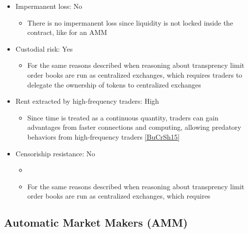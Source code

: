 \documentclass[11pt, reqno]{amsart}
\theoremstyle{definition}
\theoremstyle{remark}
\begin{document}
\begin{itemize}
\begin{itemize}
	      \end{itemize}
	\item Impermanent loss: No
	      \begin{itemize}
		      \item There is no impermanent loss since liquidity is not locked inside
                the contract, like for an AMM
	      \end{itemize}
	\item Custodial risk: Yes
	      \begin{itemize}
		      \item For the same reasons described when reasoning about transprency
                limit order books are run as centralized exchanges, which requires
                traders to delegate the ownership of tokens to centralized exchanges
	      \end{itemize}
	\item Rent extracted by high-frequency traders: High
	      \begin{itemize}
              \item Since time is treated as a continuous quantity, traders can
                gain advantages from faster connections and computing, allowing
                predatory behaviors from high-frequency traders
                \ref{BuCrSh15}
	      \end{itemize}
	\item Censoriship resistance: No
	      \begin{itemize}
              \item 
		      \item For the same reasons described when reasoning about transprency
                limit order books are run as centralized exchanges, which requires

	      \end{itemize}
\end{itemize}

\subsection{Automatic Market Makers (AMM)}
\end{document}
